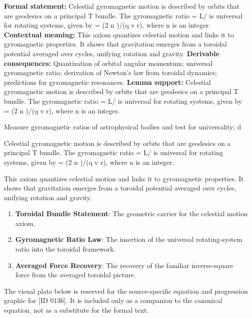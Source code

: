 \begingroup\footnotesize\setlength{\emergencystretch}{3em}\sloppy
\textbf{Formal statement:} Celestial gyromagnetic motion is described by orbits that are geodesics on a principal T  bundle. The gyromagnetic ratio   = L/  is universal for rotating systems, given by   = (2 n  )/(q v r), where n is an integer.
\textbf{Contextual meaning:} This axiom quantizes celestial motion and links it to gyromagnetic properties. It shows that gravitation emerges from a toroidal potential averaged over cycles, unifying rotation and gravity.
\textbf{Derivable consequences:} Quantization of orbital angular momentum; universal gyromagnetic ratio; derivation of Newton's law from toroidal dynamics; predictions for gyromagnetic resonances.
\textbf{Lemma support:} Celestial gyromagnetic motion is described by orbits that are geodesics on a principal T  bundle. The gyromagnetic ratio   = L/  is universal for rotating systems, given by   = (2 n  )/(q v r), where n is an integer.\par
\endgroup

Measure gyromagnetic ratios of astrophysical bodies and test for universality; d

Celestial gyromagnetic motion is described by orbits that are geodesics on a principal T  bundle. The gyromagnetic ratio   = L/  is universal for rotating systems, given by   = (2 n  )/(q v r), where n is an integer.

This axiom quantizes celestial motion and links it to gyromagnetic properties. It shows that gravitation emerges from a toroidal potential averaged over cycles, unifying rotation and gravity.
\endgroup

\begin{enumerate}[leftmargin=1.6em,itemsep=6pt,topsep=4pt]
\item \textbf{Toroidal Bundle Statement}: The geometric carrier for the celestial motion axiom.
\item \textbf{Gyromagnetic Ratio Law}: The insertion of the universal rotating-system ratio into the toroidal framework.
\item \textbf{Averaged Force Recovery}: The recovery of the familiar inverse-square force from the averaged toroidal picture.
\end{enumerate}

\begingroup\footnotesize\sloppy
The visual plate below is reserved for the source-specific equation and progression graphic for [ID 0136]. It is included only as a companion to the canonical equation, not as a substitute for the formal text.
\par\endgroup
\ifTZPDarkEdition
{}
\fi

